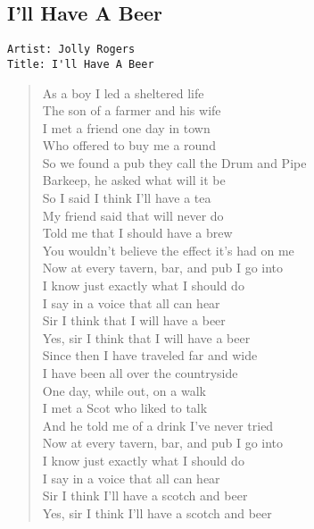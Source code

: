 \documentclass[11pt]{article}
\begin{document}
\subsection{I'll Have A Beer}
\label{sec:org16d5041}
\begin{verbatim}
Artist: Jolly Rogers
Title: I'll Have A Beer
\end{verbatim}
\begin{verse}
As a boy I led a sheltered life\\
The son of a farmer and his wife\\
I met a friend one day in town\\
Who offered to buy me a round\\
So we found a pub they call the Drum and Pipe\\
\vspace*{1em}
Barkeep, he asked what will it be\\
So I said I think I'll have a tea\\
My friend said that will never do\\
Told me that I should have a brew\\
You wouldn't believe the effect it's had on me\\
\vspace*{1em}
Now at every tavern, bar, and pub I go into\\
I know just exactly what I should do\\
I say in a voice that all can hear\\
Sir I think that I will have a beer\\
Yes, sir I think that I will have a beer\\
\vspace*{1em}
Since then I have traveled far and wide\\
I have been all over the countryside\\
One day, while out, on a walk\\
I met a Scot who liked to talk\\
And he told me of a drink I've never tried\\
\vspace*{1em}
Now at every tavern, bar, and pub I go into\\
I know just exactly what I should do\\
I say in a voice that all can hear\\
Sir I think I'll have a scotch and beer\\
Yes, sir I think I'll have a scotch and beer\\

\end{verse}
\end{document}
